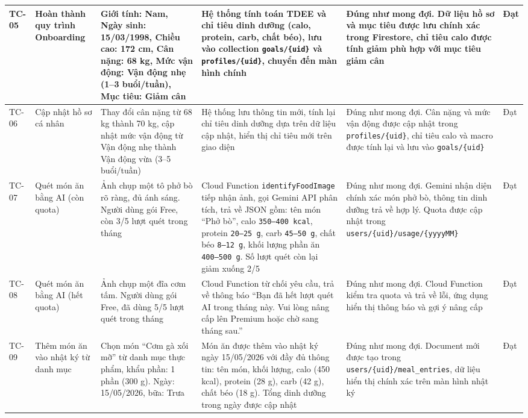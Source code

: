 \begin{longtable}{|p{1.2cm}|p{2.8cm}|p{3.2cm}|p{3.2cm}|p{2.8cm}|p{1.5cm}|}
    \hline
    TC-05 & Hoàn thành quy trình Onboarding & Giới tính: Nam, Ngày sinh: 15/03/1998, Chiều cao: 172 cm, Cân nặng: 68 kg, Mức vận động: Vận động nhẹ (1--3 buổi/tuần), Mục tiêu: Giảm cân & Hệ thống tính toán TDEE và chỉ tiêu dinh dưỡng (calo, protein, carb, chất béo), lưu vào collection \texttt{goals/\{uid\}} và \texttt{profiles/\{uid\}}, chuyển đến màn hình chính & Đúng như mong đợi. Dữ liệu hồ sơ và mục tiêu được lưu chính xác trong Firestore, chỉ tiêu calo được tính giảm phù hợp với mục tiêu giảm cân & Đạt \\
    \hline
    TC-06 & Cập nhật hồ sơ cá nhân & Thay đổi cân nặng từ 68 kg thành 70 kg, cập nhật mức vận động từ Vận động nhẹ thành Vận động vừa (3--5 buổi/tuần) & Hệ thống lưu thông tin mới, tính lại chỉ tiêu dinh dưỡng dựa trên dữ liệu cập nhật, hiển thị chỉ tiêu mới trên giao diện & Đúng như mong đợi. Cân nặng và mức vận động được cập nhật trong \texttt{profiles/\{uid\}}, chỉ tiêu calo và macro được tính lại và lưu vào \texttt{goals/\{uid\}} & Đạt \\
    \hline
    TC-07 & Quét món ăn bằng AI (còn quota) & Ảnh chụp một tô phở bò rõ ràng, đủ ánh sáng. Người dùng gói Free, còn 3/5 lượt quét trong tháng & Cloud Function \texttt{identifyFoodImage} tiếp nhận ảnh, gọi Gemini API phân tích, trả về JSON gồm: tên món ``Phở bò'', calo \texttt{350--400 kcal}, protein \texttt{20--25 g}, carb \texttt{45--50 g}, chất béo \texttt{8--12 g}, khối lượng phần ăn \texttt{400--500 g}. Số lượt quét còn lại giảm xuống 2/5 & Đúng như mong đợi. Gemini nhận diện chính xác món phở bò, thông tin dinh dưỡng trả về hợp lý. Quota được cập nhật trong \texttt{users/\{uid\}/usage/\{yyyyMM\}} & Đạt \\
    \hline
    TC-08 & Quét món ăn bằng AI (hết quota) & Ảnh chụp một đĩa cơm tấm. Người dùng gói Free, đã dùng 5/5 lượt quét trong tháng & Cloud Function từ chối yêu cầu, trả về thông báo ``Bạn đã hết lượt quét AI trong tháng này. Vui lòng nâng cấp lên Premium hoặc chờ sang tháng sau.'' & Đúng như mong đợi. Cloud Function kiểm tra quota và trả về lỗi, ứng dụng hiển thị thông báo và gợi ý nâng cấp & Đạt \\
    \hline
    TC-09 & Thêm món ăn vào nhật ký từ danh mục & Chọn món ``Cơm gà xối mỡ'' từ danh mục thực phẩm, khẩu phần: 1 phần (300 g). Ngày: 15/05/2026, bữa: Trưa & Món ăn được thêm vào nhật ký ngày 15/05/2026 với đầy đủ thông tin: tên món, khối lượng, calo (450 kcal), protein (28 g), carb (42 g), chất béo (18 g). Tổng dinh dưỡng trong ngày được cập nhật & Đúng như mong đợi. Document mới được tạo trong \texttt{users/\{uid\}/meal\_entries}, dữ liệu hiển thị chính xác trên màn hình nhật ký & Đạt \\
    \hline


\end{longtable}
